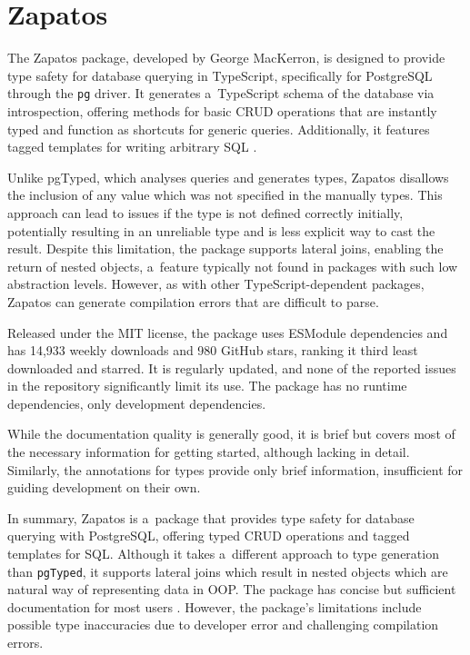 \section{Zapatos}
The Zapatos package, developed by George MacKerron, is designed to provide type
safety for database querying in TypeScript, specifically for PostgreSQL through
the \texttt{pg} driver. It generates a~TypeScript schema of the database via
introspection, offering methods for basic CRUD operations that are instantly
typed and function as shortcuts for generic queries. Additionally, it features
tagged templates for writing arbitrary SQL \cite{zapatos}.

Unlike pgTyped, which analyses queries and generates types, Zapatos disallows
the inclusion of any value which was not specified in the manually types. This
approach can lead to issues if the type is not defined correctly initially,
potentially resulting in an unreliable type and is less explicit way to cast the
result. Despite this limitation, the package supports lateral joins, enabling
the return of nested objects, a~feature typically not found in packages with
such low abstraction levels. However, as with other TypeScript-dependent
packages, Zapatos can generate compilation errors that are difficult to parse.

Released under the MIT license, the package uses ESModule dependencies and has
14,933 weekly downloads and 980 GitHub stars, ranking it third least downloaded
and starred. It is regularly updated, and none of the reported issues in the
repository significantly limit its use. The package has no runtime dependencies,
only development dependencies.

While the documentation quality is generally good, it is brief but covers most
of the necessary information for getting started, although lacking in detail.
Similarly, the annotations for types provide only brief information,
insufficient for guiding development on their own.

In summary, Zapatos is a~package that provides type safety for database querying
with PostgreSQL, offering typed CRUD operations and tagged templates for SQL.
Although it takes a~different approach to type generation than \texttt{pgTyped},
it supports lateral joins which result in nested objects which are natural way
of representing data in OOP. The package has concise but sufficient
documentation for most users \cite{zapatosDocs}. However, the package's
limitations include possible type inaccuracies due to developer error and
challenging compilation errors. 

